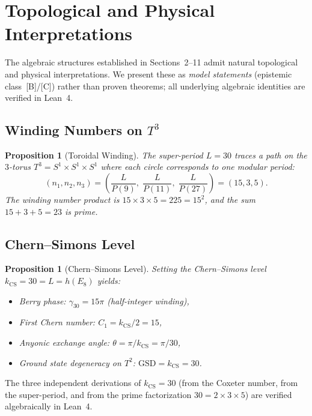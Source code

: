 \documentclass[11pt, a4paper]{article}
\theoremstyle{plain}
\newtheorem{proposition}[theorem]{Proposition}
\theoremstyle{definition}
\theoremstyle{remark}
\begin{document}
\section{Topological and Physical
  Interpretations}\label{sec:topology}

The algebraic structures established in Sections~2--11 admit natural
topological and physical interpretations. We present these as
\emph{model statements} (epistemic class~[B]/[C]) rather than proven
theorems; all underlying algebraic identities are verified in Lean~4.

\subsection{Winding Numbers on \texorpdfstring{$T^3$}{T3}}

\begin{proposition}[Toroidal Winding]\label{prop:winding}
The super-period $L = 30$ traces a path on the $3$-torus
$T^3 = S^1 \times S^1 \times S^1$ where each circle corresponds to one
modular period:
\[
  (n_1, n_2, n_3) = \left(\frac{L}{P(9)},\;
  \frac{L}{P(11)},\; \frac{L}{P(27)}\right)
  = (15, 3, 5).
\]
The winding number product is $15 \times 3 \times 5 = 225 = 15^2$, and
the sum $15 + 3 + 5 = 23$ is prime.
\end{proposition}

\subsection{Chern--Simons Level}

\begin{proposition}[Chern--Simons Level]\label{prop:cs}
Setting the Chern--Simons level $k_{\mathrm{CS}} = 30 = L = h(E_8)$
yields:
\begin{itemize}
  \item Berry phase: $\gamma_{30} = 15\pi$ (half-integer winding),
  \item First Chern number: $C_1 = k_{\mathrm{CS}} / 2 = 15$,
  \item Anyonic exchange angle: $\theta = \pi / k_{\mathrm{CS}}
    = \pi / 30$,
  \item Ground state degeneracy on $T^2$: $\mathrm{GSD} = k_{\mathrm{CS}} = 30$.
\end{itemize}
\end{proposition}

The three independent derivations of $k_{\mathrm{CS}} = 30$ (from the
Coxeter number, from the super-period, and from the prime
factorization $30 = 2 \times 3 \times 5$) are verified algebraically in
Lean~4.
\end{document}
